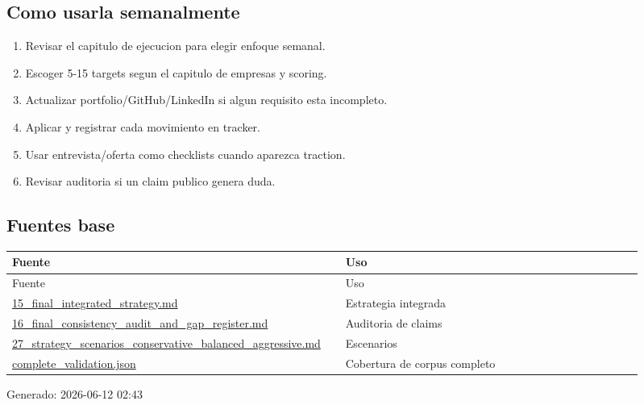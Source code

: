 \subsection{Como usarla semanalmente}


\begin{enumerate}
\item Revisar el capitulo de ejecucion para elegir enfoque semanal.
\item Escoger 5-15 targets segun el capitulo de empresas y scoring.
\item Actualizar portfolio/GitHub/LinkedIn si algun requisito esta incompleto.
\item Aplicar y registrar cada movimiento en tracker.
\item Usar entrevista/oferta como checklists cuando aparezca traction.
\item Revisar auditoria si un claim publico genera duda.
\end{enumerate}


\subsection{Fuentes base}


\begin{center}
\scriptsize
\begin{longtable}{>{\raggedright\arraybackslash}p{0.455\linewidth} >{\raggedright\arraybackslash}p{0.455\linewidth}}
\toprule
Fuente & Uso \\
\midrule
\endfirsthead
\toprule
Fuente & Uso \\
\midrule
\endhead
\href{file:///E:/Laboral/15_final_integrated_strategy.md}{15\_final\_integrated\_strategy.md} & Estrategia integrada \\
\href{file:///E:/Laboral/16_final_consistency_audit_and_gap_register.md}{16\_final\_consistency\_audit\_and\_gap\_register.md} & Auditoria de claims \\
\href{file:///E:/Laboral/27_strategy_scenarios_conservative_balanced_aggressive.md}{27\_strategy\_scenarios\_conservative\_balanced\_aggressive.md} & Escenarios \\
\href{file:///E:/Laboral/_pdf_biblia/complete_validation.json}{complete\_validation.json} & Cobertura de corpus completo \\
\bottomrule
\end{longtable}
\end{center}



Generado: 2026-06-12 02:43

